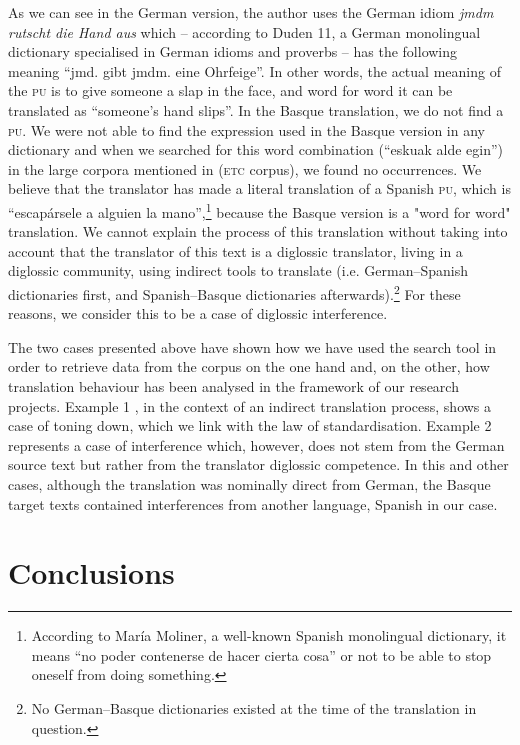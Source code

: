 \documentclass[output=paper]{LSP/langsci}
\begin{document}
As we can see in the German version, the author uses the German idiom \textit{jmdm rutscht die Hand aus} which -- according to Duden 11, a German monolingual dictionary specialised in German idioms and proverbs -- has the following meaning “jmd. gibt jmdm. eine Ohrfeige”. In other words, the actual meaning of the \textsc{pu} is to give someone a slap in the face, and word for word it can be translated as “someone's hand slips”. In the Basque translation, we do not find a \textsc{pu}. We were not able to find the expression used in the Basque version in any dictionary and when we searched for this word combination (“eskuak alde egin”) in the large corpora mentioned in  (\textsc{etc} corpus), we found no occurrences. We believe that the translator has made a literal translation of a Spanish \textsc{pu}, which is “escapársele a alguien la mano”,\footnote{According to María Moliner, a well-known Spanish monolingual dictionary, it means “no poder contenerse de hacer cierta cosa” or not to be able to stop oneself from doing something.} because the Basque version is a "word for word" translation. We cannot explain the process of this translation without taking into account that the translator of this text is a diglossic translator, living in a diglossic community, using indirect tools to translate (i.e. German--Spanish dictionaries first, and Spanish--Basque dictionaries afterwards).\footnote{No German--Basque dictionaries existed at the time of the translation in question.} For these reasons, we consider this to be a case of diglossic interference.

The two cases presented above have shown how we have used the search tool in order to retrieve data from the corpus on the one hand and, on the other, how translation behaviour has been analysed in the framework of our research projects. Example 1 , in the context of an indirect translation process, shows a case of toning down, which we link with the law of standardisation. Example 2  represents a case of interference which, however, does not stem from the German source text but rather from the translator diglossic competence. In this and other cases, although the translation was nominally direct from German, the Basque target texts contained interferences from another language, Spanish in our case.

\section{Conclusions}
\end{document}
